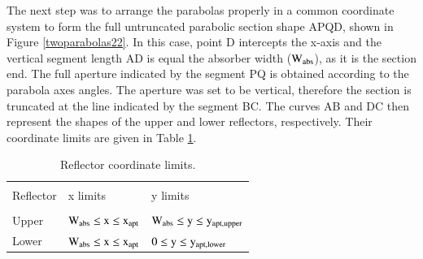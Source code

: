 The next step was to arrange the parabolas properly in a common coordinate system to form the full untruncated parabolic section shape APQD, shown in Figure \ref{twoparabolas22}. In this case, point D intercepts the x-axis and the vertical segment length AD is equal the absorber width ($\rm{W_{abs}}$), as it is the section end. The full aperture indicated by the segment PQ is obtained according to the parabola axes angles. The aperture was set to be vertical, therefore the section is truncated at the line indicated by the segment BC. The curves AB and DC then represent the shapes of the upper and lower reflectors, respectively. Their coordinate limits are given in Table \ref{coordinates}.


\begin{table}[!ht]
	\centering
	\caption{Reflector coordinate limits.}
	\begin{tabular}{lll}
		\hline \\[-12pt]
		\vspace*{0.1cm} Reflector & x limits & y limits \\ [0pt]
		\hline \\[-12pt]
		Upper & $\rm{{W_{abs}} \le {x} \le {x_{apt}}}$ & $\rm{{W_{abs}} \le {y} \le {y_{apt,upper}}}$ \\ [5pt]
		Lower & $\rm{{W_{abs}} \le {x} \le {x_{apt}}}$ & $\rm{0 \le {y} \le {y_{apt,lower}}}$ \\ 
		\hline 
	\end{tabular}
	\label{coordinates}
\end{table}

